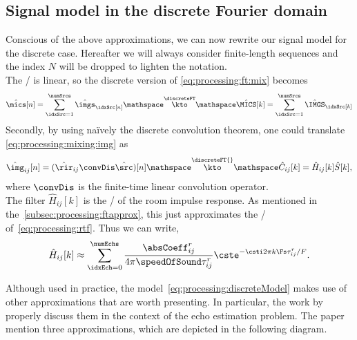 \subsection{Signal model in the discrete Fourier domain}\label{sec:processing:fouriermodel}
Conscious of the above approximations, we can now rewrite our signal model for the discrete case.
Hereafter we will always consider finite-length sequences and the index $N$ will be dropped to lighten the notation.
\\The \DFT/ is linear, so the discrete version of \cref{eq:processing:ft:mix} becomes
\begin{equation}\label{eq:processing:dft:mix}
    \hat{\mics}[ n] = \sum_{\idxSrc=1}^{\numSrcs} \hat{\imgs}_\idxSrc[ n]
    \mathspace\overset{\discreteFT}{\kto}\mathspace
    \hat{\MICS}[ k] = \sum_{\idxSrc=1}^{\numSrcs} \hat{\IMGS}_\idxSrc[ k]
\end{equation}
Secondly, by using na\"ively the discrete convolution theorem, one could translate \cref{eq:processing:mixing:img} as
\begin{equation}\label{eq:processing:discreteModel}
    \hat{\img}_{ij}[n] = (\hat{\rir}_{ij} \convDis \hat{\src})[n]
    \mathspace\overset{\discreteFT{}}{\kto}\mathspace
    \hat{C}_{ij}[k] = \hat{H}_{ij}[k] \hat{S}[k]
    ,
\end{equation}
where $\convDis$ is the finite-time linear convolution operator.
\\The filter $\hat{H}_{ij}[k]$ is the \DFT/ of the room impulse response.
As mentioned in the~\cref{subsec:processing:ftapprox}, this just approximates the \RTF/ of~\cref{eq:processing:rtf}.
Thus we can write,
\begin{equation}\label{eq:processing:discreteModel:rir}
    \hat{H}_{ij}[ k] \approx \sum_{\idxEch=0}^{\numEchs}
                \frac{\absCoeff_{ij}^r}{4 \pi \speedOfSound \tau_{ij}^r}
                \cste^{- \csti 2 \pi k \Fs \tau_{ij}^r / F}
    .
\end{equation}

\mynewline
Although used in practice, the model~\eqref{eq:processing:discreteModel} makes use of other approximations that are worth presenting.
In particular, the work by~ properly discuss them in the context of the echo estimation problem.
The paper mention three approximations, which are depicted in the following diagram.

